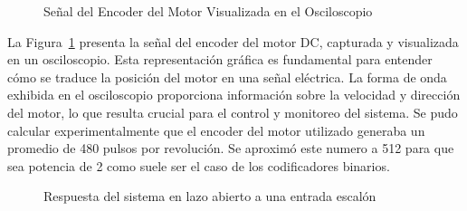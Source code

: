 \documentclass[conference,onecolumn]{IEEEtran}
\begin{document}
\begin{figure}[H]
    \centering
    \caption{Señal del Encoder del Motor Visualizada en el Osciloscopio}
    \label{fig:encoder_signal}
\end{figure}

La Figura~\ref{fig:encoder_signal} presenta la señal del encoder del motor DC, capturada y visualizada en un osciloscopio. Esta representación gráfica es fundamental para entender cómo se traduce la posición del motor en una señal eléctrica. La forma de onda exhibida en el osciloscopio proporciona información sobre la velocidad y dirección del motor, lo que resulta crucial para el control y monitoreo del sistema. Se pudo calcular experimentalmente que el encoder del motor utilizado generaba un promedio de 480 pulsos por revolución. Se aproximó este numero a 512 para que sea potencia de 2 como suele ser el caso de los codificadores binarios.

\begin{figure}[H]
    \centering
    \caption{Respuesta del sistema en lazo abierto a una entrada escalón}
    \label{fig:open_loop_response}
\end{figure}
\end{document}

